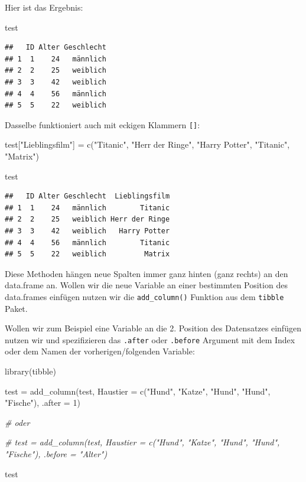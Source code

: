 \documentclass[
]{book}
\newenvironment{Shaded}{\begin{snugshade}}{\end{snugshade}}
\newcommand{\AttributeTok}[1]{\textcolor[rgb]{0.77,0.63,0.00}{#1}}
\newcommand{\CommentTok}[1]{\textcolor[rgb]{0.56,0.35,0.01}{\textit{#1}}}
\newcommand{\DecValTok}[1]{\textcolor[rgb]{0.00,0.00,0.81}{#1}}
\newcommand{\FunctionTok}[1]{\textcolor[rgb]{0.00,0.00,0.00}{#1}}
\newcommand{\NormalTok}[1]{#1}
\newcommand{\OtherTok}[1]{\textcolor[rgb]{0.56,0.35,0.01}{#1}}
\newcommand{\StringTok}[1]{\textcolor[rgb]{0.31,0.60,0.02}{#1}}
\begin{document}
Hier ist das Ergebnis:

\begin{Shaded}
\begin{Highlighting}[]
\NormalTok{test}
\end{Highlighting}
\end{Shaded}

\begin{verbatim}
##   ID Alter Geschlecht
## 1  1    24   männlich
## 2  2    25   weiblich
## 3  3    42   weiblich
## 4  4    56   männlich
## 5  5    22   weiblich
\end{verbatim}

Dasselbe funktioniert auch mit eckigen Klammern \texttt{{[}{]}}:

\begin{Shaded}
\begin{Highlighting}[]
\NormalTok{test[}\StringTok{"Lieblingsfilm"}\NormalTok{] }\OtherTok{=} \FunctionTok{c}\NormalTok{(}\StringTok{"Titanic"}\NormalTok{, }\StringTok{"Herr der Ringe"}\NormalTok{, }\StringTok{"Harry Potter"}\NormalTok{, }\StringTok{"Titanic"}\NormalTok{, }\StringTok{"Matrix"}\NormalTok{)}

\NormalTok{test}
\end{Highlighting}
\end{Shaded}

\begin{verbatim}
##   ID Alter Geschlecht  Lieblingsfilm
## 1  1    24   männlich        Titanic
## 2  2    25   weiblich Herr der Ringe
## 3  3    42   weiblich   Harry Potter
## 4  4    56   männlich        Titanic
## 5  5    22   weiblich         Matrix
\end{verbatim}

Diese Methoden hängen neue Spalten immer ganz hinten (ganz rechts) an den data.frame an.
Wollen wir die neue Variable an einer bestimmten Position des data.frames einfügen nutzen wir die \texttt{add\_column()} Funktion aus dem \texttt{tibble} Paket.

Wollen wir zum Beispiel eine Variable an die 2. Position des Datensatzes einfügen nutzen wir und spezifizieren das \texttt{.after} oder \texttt{.before} Argument mit dem Index oder dem Namen der vorherigen/folgenden Variable:

\begin{Shaded}
\begin{Highlighting}[]
\FunctionTok{library}\NormalTok{(tibble)}

\NormalTok{test }\OtherTok{=} \FunctionTok{add\_column}\NormalTok{(test, }\AttributeTok{Haustier =} \FunctionTok{c}\NormalTok{(}\StringTok{"Hund"}\NormalTok{, }\StringTok{"Katze"}\NormalTok{, }\StringTok{"Hund"}\NormalTok{, }\StringTok{"Hund"}\NormalTok{, }\StringTok{"Fische"}\NormalTok{),  }\AttributeTok{.after =} \DecValTok{1}\NormalTok{)}

\CommentTok{\# oder }

\CommentTok{\# test = add\_column(test, Haustier = c("Hund", "Katze", "Hund", "Hund", "Fische"),  .before = "Alter")}

\NormalTok{test}
\end{Highlighting}
\end{Shaded}
\end{document}
